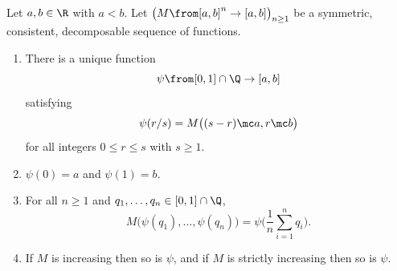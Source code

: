 \begin{lemma}
Let $a, b \in \R$ with $a < b$.  Let $\bigl( M \from [a, b]^n \to [a, b]
\bigr)_{n \geq 1}$ be a symmetric, consistent, decomposable sequence of
functions. 
% 
\begin{enumerate}
\item
{}
There is a unique function
\[
\psi \from [0, 1] \cap \Q \to [a, b]
\]
satisfying
\[
\psi(r/s) = M \bigl( (s - r) \mc a, r \mc b \bigr)
\]
for all integers $0 \leq r \leq s$ with $s \geq 1$. 

\item
{}
$\psi(0) = a$ and $\psi(1) = b$.

\item
{}
For all $n \geq 1$ and $q_1, \ldots, q_n \in [0, 1] \cap \Q$,
\[
M \bigl( \psi(q_1), \ldots, \psi(q_n) \bigr)
=
\psi \Biggl( \frac{1}{n} \sum_{i = 1}^n q_i \Biggr).
\]

\item
{} 
If $M$ is increasing then so is $\psi$, and if $M$ is strictly increasing
then so is $\psi$.
\end{enumerate}
\end{lemma}

